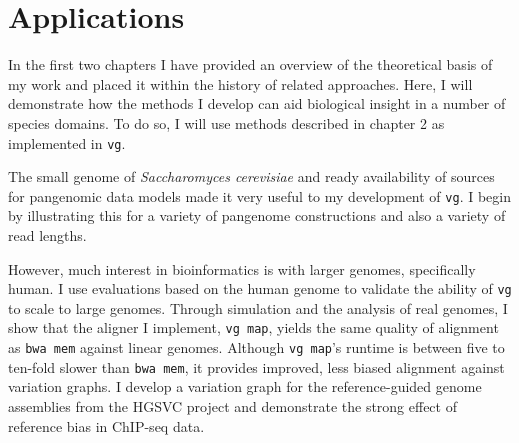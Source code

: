 \documentclass[a4paper,12pt,numbered,oneside]{Classes/PhDThesisPSnPDF}
\providecommand{\DIFaddbegin}{} %
\providecommand{\DIFaddend}{} %
\begin{document}




%
\chapter{Applications}
\DIFaddbegin \label{chapter:applications}
\DIFaddend 

\ifpdf
    \graphicspath{{Chapter3/Figs/Raster/}{Chapter3/Figs/PDF/}{Chapter3/Figs/}}
\else
    \graphicspath{{Chapter3/Figs/Vector/}{Chapter3/Figs/}}
\fi

In the first two chapters I have provided an overview of the theoretical basis of my work and placed it within the history of related approaches.
Here, I will demonstrate how the methods I develop can aid biological insight in a number of species domains.
To do so, I will use methods described in chapter 2 as implemented in {\tt vg}.

The small genome of \emph{Saccharomyces cerevisiae} and ready availability of sources for pangenomic data models made it very useful to my development of {\tt vg}.
I begin by illustrating this for a variety of pangenome constructions and also a variety of read lengths.

However, much interest in bioinformatics is with larger genomes, specifically human.
I use evaluations based on the human genome to validate the ability of {\tt vg} to scale to large genomes.
Through simulation and the analysis of real genomes, I show that the aligner I implement, {\tt vg map}, yields the same quality of alignment as {\tt bwa mem} against linear genomes.
Although {\tt vg map}'s runtime is between five to ten-fold slower than {\tt bwa mem}, it provides improved, less biased alignment against variation graphs.
I develop a variation graph for the reference-guided genome assemblies from the HGSVC project and demonstrate the strong effect of reference bias in ChIP-seq data.
\end{document}
